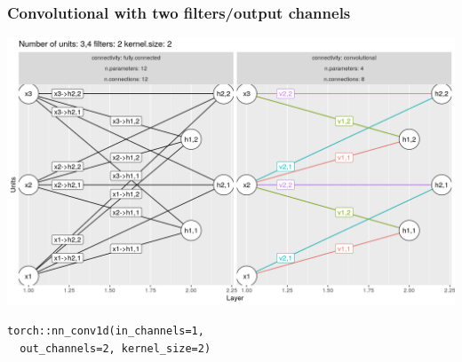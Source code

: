 \documentclass{beamer}
\begin{document}
\begin{frame}[fragile]
  \frametitle{Convolutional with two filters/output channels}
  \includegraphics[width=\textwidth]{figure-convolutional-filters-3-2-2}
  
\begin{verbatim}
torch::nn_conv1d(in_channels=1, 
  out_channels=2, kernel_size=2)
\end{verbatim}
\end{frame}
\end{document}
